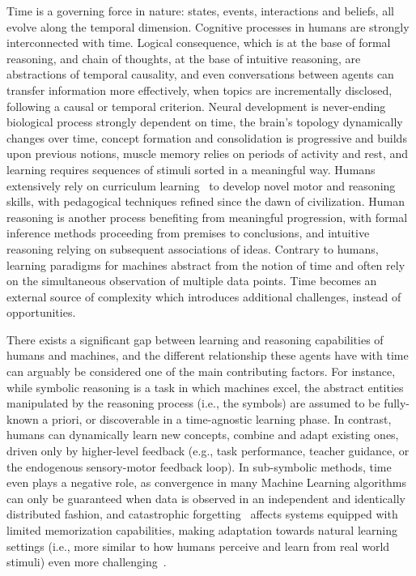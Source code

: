 

Time is a governing force in nature: states, events, interactions and beliefs, all evolve along the temporal dimension. Cognitive processes in humans are strongly interconnected with time. Logical consequence, which is at the base of formal reasoning, and chain of thoughts, at the base of intuitive reasoning, are abstractions of temporal causality, and even conversations between agents can transfer information more effectively, when topics are incrementally disclosed, following a causal or temporal criterion. 
Neural development is never-ending biological process strongly dependent on time, the brain's topology dynamically changes over time, concept formation and consolidation is progressive and builds upon previous notions, muscle memory relies on periods of activity and rest, and learning requires sequences of stimuli sorted in a meaningful way.
%
Humans extensively rely on curriculum learning~\cite{bengio2009curriculum} to develop novel motor and reasoning skills, with pedagogical techniques refined since the dawn of civilization.
%
Human reasoning is another process benefiting from meaningful progression, with formal inference methods proceeding from premises to conclusions, and intuitive reasoning relying on subsequent associations of ideas.
Contrary to humans, learning paradigms for machines abstract from the notion of time and often rely on the simultaneous observation of multiple data points. Time becomes an external source of complexity which introduces additional challenges, instead of opportunities.

There exists a significant gap between learning and reasoning capabilities of humans and machines, and the different relationship these agents have with time can arguably be considered one of the main contributing factors.
For instance, while symbolic reasoning is a task in which machines excel, the abstract entities manipulated by the reasoning process (i.e., the symbols) are assumed to be fully-known a priori, or discoverable in a time-agnostic learning phase. In contrast, humans can dynamically learn new concepts, combine and adapt existing ones, driven only by higher-level feedback (e.g., task performance, teacher guidance, or the endogenous sensory-motor feedback loop). 
In sub-symbolic methods, time even plays a negative role, as convergence in many Machine Learning algorithms can only be guaranteed when data is observed in an independent and identically distributed fashion, and catastrophic forgetting~\cite{mccloskey1989catastrophic} affects systems equipped with limited memorization capabilities, making adaptation towards natural learning settings (i.e., more similar to how humans perceive and learn from real world stimuli) even more challenging~\cite{casoni2024pitfalls}.

